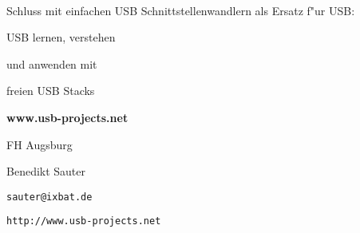 \documentclass[11pt]{article}
\begin{document}
\hskip 12mm
\begin{minipage}[t]{7cm}
\hfill {\Large\sf \ }\\


{\Large
\begin{center}
   Schluss mit einfachen USB Schnittstellenwandlern
	 als Ersatz f"ur USB:

\smallskip
	USB lernen, verstehen

\smallskip
	
	und anwenden mit

\smallskip

	freien USB Stacks

\end{center} 
}


\vskip 5mm

\centerline{\large\bf www.usb-projects.net}

\vskip 5mm

\bigskip

\centerline{FH Augsburg}

\bigskip

\centerline{Benedikt Sauter}

\bigskip

\centerline{{\tt sauter@ixbat.de}}

\bigskip

\centerline{{\tt http://www.usb-projects.net}}

\end{minipage}
\end{document}

